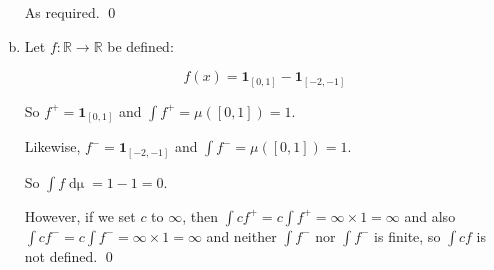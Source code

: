 \documentclass[11pt,oneside]{article}
\numberwithin{equation}{section}
\theoremstyle{definition}
\def\RR{\mathbb{R}}
\def\one{\mathbf{1}}
\begin{document}
\begin{solution}
\begin{enumerate}[(a)]
  As required.  \qed  

  
\item
  Let $f : \RR \to \RR$ be defined:

  \[
  f(x) =  \one_{[0, 1]} - \one_{[-2, -1]}
  \]

  So $f^+ =  \one_{[0, 1]}$ and $\int f^+ = \mu([0,1]) = 1$.

  Likewise, $f^- =  \one_{[-2, -1]}$ and $\int f^- = \mu([0,1]) = 1$.

  So $\int f \mathop{d \mu} = 1 - 1 = 0$.

  However, if we set $c$ to $\infty$, then $ \int c f^+ = c \int f^+ = \infty \times 1 = \infty$ and
  also  $ \int c f^- = c \int f^- = \infty \times 1 = \infty$ and neither $\int f^-$ nor $\int f^-$ is finite, so
  $\int c f$ is not defined.  
  \qed
  
\end{enumerate}
\end{solution}
\end{document}
